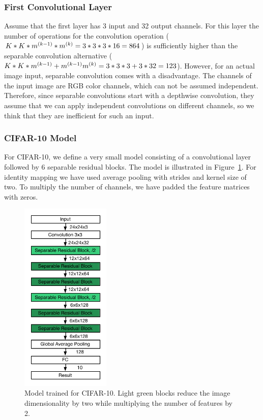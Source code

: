 \subsubsection{First Convolutional Layer}
Assume that the first layer has 3 input and 32 output channels. For this layer the number of operations for the convolution operation ($K*K*m^{(k-1)}*m^{(k)} = 3*3*3*16 = 864$) is sufficiently higher than the separable convolution alternative ($K*K*m^{(k-1)} + m^{(k-1)}m^{(k)} = 3*3*3 + 3*32=123$). However, for an actual image input, separable convolution comes with a disadvantage. The channels of the input image are RGB color channels, which can not be assumed independent. Therefore, since separable convolutions start with a depthwise convolution, they assume that we can apply independent convolutions on different channels, so we think that they are inefficient for such an input.

\subsubsection{CIFAR-10 Model}
For CIFAR-10, we define a very small model consisting of a convolutional layer followed by 6 separable residual blocks.  The model is illustrated in Figure~\ref{fig:separable_resnet_cifar10}. For identity mapping we have used average pooling with strides and kernel size of two. To multiply the number of channels, we have padded the feature matrices with zeros.

\begin{figure}[!h]
  \begin{center}
    \includegraphics[width=0.38\textwidth]{images/separable_resnet_cifar10.pdf}
  \end{center}
  \caption{Model trained for CIFAR-10. Light green blocks reduce the image dimensionality by two while multiplying the number of features by 2.}
  \label{fig:separable_resnet_cifar10}
\end{figure}

